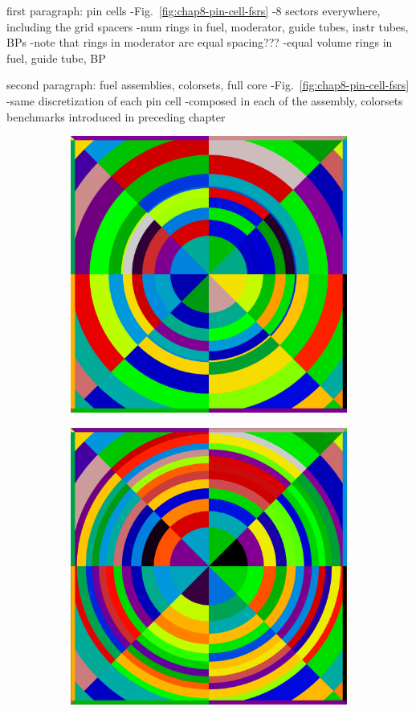 first paragraph: pin cells
-Fig.~\ref{fig:chap8-pin-cell-fsrs}
-8 sectors everywhere, including the grid spacers
-num rings in fuel, moderator, guide tubes, instr tubes, BPs
-note that rings in moderator are equal spacing???
-equal volume rings in fuel, guide tube, BP

second paragraph: fuel assemblies, colorsets, full core
-Fig.~\ref{fig:chap8-pin-cell-fsrs}
-same discretization of each pin cell
-composed in each of the assembly, colorsets benchmarks introduced in preceding chapter



\begin{figure}[h!]
\centering
\begin{subfigure}{.5\textwidth}
  \centering
  \includegraphics[width=0.9\linewidth]{figures/quantification/fsrs/fsrs-fuel-pin}
  \caption{}
  \label{fig:chap8-pin-1.6}
\end{subfigure}%
\begin{subfigure}{.5\textwidth}
  \centering
  \includegraphics[width=0.9\linewidth]{figures/quantification/fsrs/fsrs-crgt}

\end{subfigure}
\end{figure}
